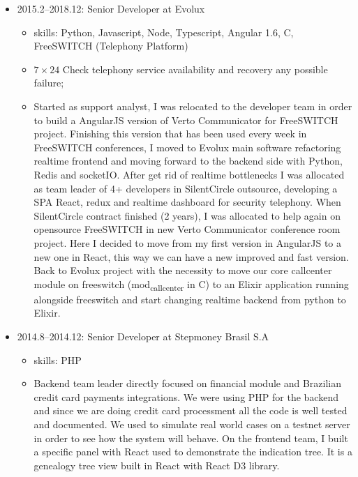 \documentclass[
]{article}
\providecommand{\tightlist}{%
  \setlength{\itemsep}{0pt}\setlength{\parskip}{0pt}}
\begin{document}
\begin{itemize}
\tightlist
\item
  2015.2--2018.12: Senior Developer at Evolux

  \begin{itemize}
  \tightlist
  \item
    skills: Python, Javascript, Node, Typescript, Angular 1.6, C,
    FreeSWITCH (Telephony Platform)
  \item
    \(7 \times 24\) Check telephony service availability and recovery
    any possible failure;
  \item
    Started as support analyst, I was relocated to the developer team in
    order to build a AngularJS version of Verto Communicator for
    FreeSWITCH project. Finishing this version that has been used every
    week in FreeSWITCH conferences, I moved to Evolux main software
    refactoring realtime frontend and moving forward to the backend side
    with Python, Redis and socketIO. After get rid of realtime
    bottlenecks I was allocated as team leader of 4+ developers in
    SilentCircle outsource, developing a SPA React, redux and realtime
    dashboard for security telephony. When SilentCircle contract
    finished (2 years), I was allocated to help again on opensource
    FreeSWITCH in new Verto Communicator conference room project. Here I
    decided to move from my first version in AngularJS to a new one in
    React, this way we can have a new improved and fast version. Back to
    Evolux project with the necessity to move our core callcenter module
    on freeswitch (mod\textsubscript{callcenter} in C) to an Elixir
    application running alongside freeswitch and start changing realtime
    backend from python to Elixir.
  \end{itemize}
\end{itemize}

\vspace{2mm}

\begin{itemize}
\tightlist
\item
  2014.8--2014.12: Senior Developer at Stepmoney Brasil S.A

  \begin{itemize}
  \tightlist
  \item
    skills: PHP
  \item
    Backend team leader directly focused on financial module and
    Brazilian credit card payments integrations. We were using PHP for
    the backend and since we are doing credit card processment all the
    code is well tested and documented. We used to simulate real world
    cases on a testnet server in order to see how the system will
    behave. On the frontend team, I built a specific panel with React
    used to demonstrate the indication tree. It is a genealogy tree view
    built in React with React D3 library.
  \end{itemize}
\end{itemize}
\end{document}
